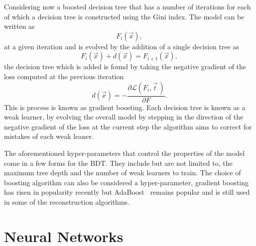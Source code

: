 Considering now a boosted decision tree that has a number of iterations for each
of which a decision tree is constructed using the Gini index. The model can be
written as
\begin{equation}
  F_i(\vec{x}),
\end{equation}
at a given iteration and is evolved by the addition of a single decision tree as
\begin{equation}
  F_i({\vec{x}}) + d(\vec{x}) = F_{i+1}(\vec{x}),
\end{equation}
the decision tree which is added is found by taking the negative gradient of the
loss computed at the previous iteration
\begin{equation}
  d(\vec{x}) = - \frac{\partial \mathcal{L}(F_i, \vec{t} \,)}{\partial F}.
\end{equation}
This is process is known as gradient boosting. Each decision tree is known as a
weak learner, by evolving the overall model by stepping in the direction of the
negative gradient of the loss at the current step the algorithm aims to correct
for mistakes of each weak leaner.

The aforementioned hyper-parameters that control the properties of the model
come in a few forms for the BDT. They include but are not limited to, the
maximum tree depth and the number of weak learners to train. The choice of
boosting algorithm can also be considered a hyper-parameter, gradient boosting
has risen in popularity recently but AdaBoost~\cite{AdaBoost} remains popular
and is still used in some of the reconstruction algorithms.

\section{Neural Networks}%

\label{sec:neural-networks}

